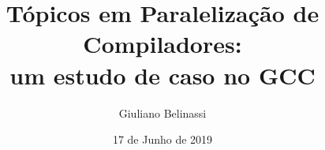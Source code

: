 
\title[The shortened title]{Tópicos em Paralelização de Compiladores:\\ um estudo de caso no GCC}

\author[Authors Name]{Giuliano Belinassi}


\date{17 de Junho de 2019}


%






